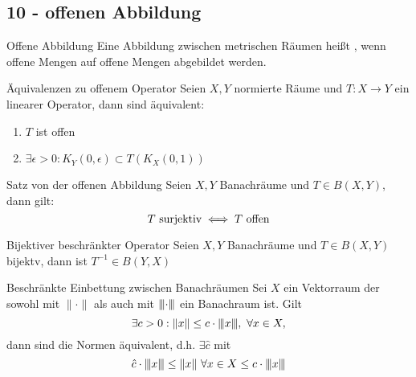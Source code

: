 \subsection*{10 - offenen Abbildung}

	\begin{karte}{Offene Abbildung}
			Eine Abbildung zwischen metrischen Räumen heißt , wenn offene Mengen auf offene Mengen abgebildet werden.
	\end{karte}
	
	\begin{karte}{Äquivalenzen zu offenem Operator}
				Seien $X, Y$ normierte Räume und $T: X \rightarrow Y$ ein linearer Operator, dann sind äquivalent:
		\begin{enumerate}[label=\alph*\upshape)]
			\item $T$ ist offen
			\item $\exists \epsilon > 0: K_{Y}(0, \epsilon) \subset T(K_{X}(0, 1))$
		\end{enumerate}
	\end{karte}
	
	\begin{karte}{Satz von der offenen Abbildung}
		Seien $X, Y$ Banachräume und $T \in B(X, Y)$, dann gilt:
		\[ T \text{ surjektiv} \iff T \text{ offen} \]
	\end{karte}

	\begin{karte}{Bijektiver beschränkter Operator}	
		Seien $X, Y$ Banachräume und $T \in B(X, Y)$ bijektv, dann ist $T^{-1} \in B(Y, X)$	
	\end{karte}

	\begin{karte}{Beschränkte Einbettung zwischen Banachräumen}	
		Sei $X$	ein Vektorraum der sowohl mit $\| \cdot \|$ als auch mit ${\left\vert\kern-0.25ex\left\vert\kern-0.25ex\left\vert\cdot\right\vert\kern-0.25ex\right\vert\kern-0.25ex\right\vert}$ ein Banachraum ist. Gilt 
		\[ \exists c > 0: \| x \| \leq c \cdot {\left\vert\kern-0.25ex\left\vert\kern-0.25ex\left\vert x\right\vert\kern-0.25ex\right\vert\kern-0.25ex\right\vert}, ~ \forall x \in X, \]
		dann sind die Normen äquivalent, d.h. $\exists \hat{c} $ mit 
		\[ \hat{c} \cdot {\left\vert\kern-0.25ex\left\vert\kern-0.25ex\left\vert x\right\vert\kern-0.25ex\right\vert\kern-0.25ex\right\vert} \leq \| x \| ~ \forall x \in X \leq c \cdot {\left\vert\kern-0.25ex\left\vert\kern-0.25ex\left\vert x\right\vert\kern-0.25ex\right\vert\kern-0.25ex\right\vert} \]
	\end{karte}